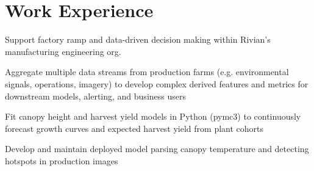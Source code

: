 \documentclass[]{deedy-resume-openfont}
\begin{document}
\hfill
\begin{minipage}[t]{0.66\textwidth} 


\section{Work Experience}

Support factory ramp and data-driven decision making within Rivian's manufacturing engineering org. 
\sectionsep


\vspace{\topsep} %
\begin{tightemize}
\item Aggregate multiple data streams from production farms (e.g. environmental signals, operations, imagery) to develop complex derived features and metrics for downstream models, alerting, and business users
\item Fit canopy height and harvest yield models in Python (pymc3) to continuously forecast growth curves and expected harvest yield from plant cohorts
\item Develop and maintain deployed model parsing canopy temperature and detecting hotspots in production images
\end{tightemize}
\sectionsep



\end{minipage}
\end{document}
